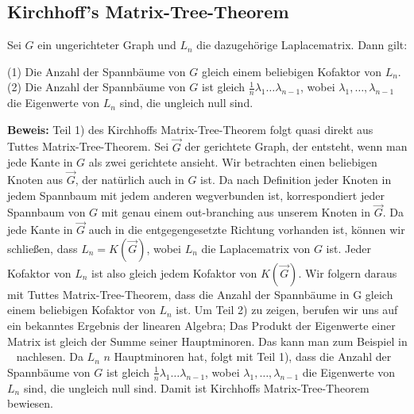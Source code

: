 \graphicspath{{grafiken/}}

\subsection{Kirchhoff's Matrix-Tree-Theorem}
\begin{Tms}
Sei $G$ ein ungerichteter Graph und $L_n$  die dazugehörige Laplacematrix. 
Dann gilt:
\par
\begingroup
\leftskip=20pt%
\rightskip=20pt
\noindent %
(1) Die Anzahl der Spannbäume von $G$ gleich einem beliebigen Kofaktor von $L_n$.\\
(2) Die Anzahl der Spannbäume von $G$ ist gleich $\frac{1}{n}\lambda_1\ldots\lambda_{n-1}$, wobei $\lambda_1,\ldots,\lambda_{n-1}$ die Eigenwerte von $L_n$ sind, die ungleich null sind.
\par
\endgroup
\end{Tms}

\textbf{Beweis:}
Teil 1) des Kirchhoffs Matrix-Tree-Theorem folgt quasi direkt aus Tuttes Matrix-Tree-Theorem. Sei $\vec{G}$ der gerichtete Graph, der entsteht, wenn man jede Kante in $G$ als zwei gerichtete ansieht. Wir betrachten einen beliebigen Knoten aus $\vec{G}$, der natürlich auch in $G$ ist. Da nach Definition jeder Knoten in jedem Spannbaum mit jedem anderen wegverbunden ist, korrespondiert jeder Spannbaum von $G$ mit genau einem out-branching aus unserem Knoten in $\vec{G}$. Da jede Kante in $\vec{G}$ auch in die entgegengesetzte Richtung vorhanden ist, können wir schließen, dass $L_n=K(\vec{G})$, wobei $L_n$ die Laplacematrix von $G$ ist. Jeder Kofaktor von $L_n$ ist also gleich jedem Kofaktor von $K(\vec{G})$.
Wir folgern daraus mit Tuttes Matrix-Tree-Theorem, dass die Anzahl der Spannbäume in G gleich einem beliebigen Kofaktor von $L_n$ ist.
Um Teil 2) zu zeigen, berufen wir uns auf ein bekanntes Ergebnis der linearen Algebra; Das Produkt der Eigenwerte einer Matrix ist gleich der Summe seiner Hauptminoren. Das kann man zum Beispiel in ~\cite{meyer_2005} nachlesen. Da $L_n$ $n$ Hauptminoren hat, folgt mit Teil 1), dass die Anzahl der Spannbäume von $G$ ist gleich $\frac{1}{n}\lambda_1\ldots\lambda_{n-1}$, wobei $\lambda_1,\ldots,\lambda_{n-1}$ die Eigenwerte von $L_n$ sind, die ungleich null sind. Damit ist Kirchhoffs Matrix-Tree-Theorem bewiesen.
 
